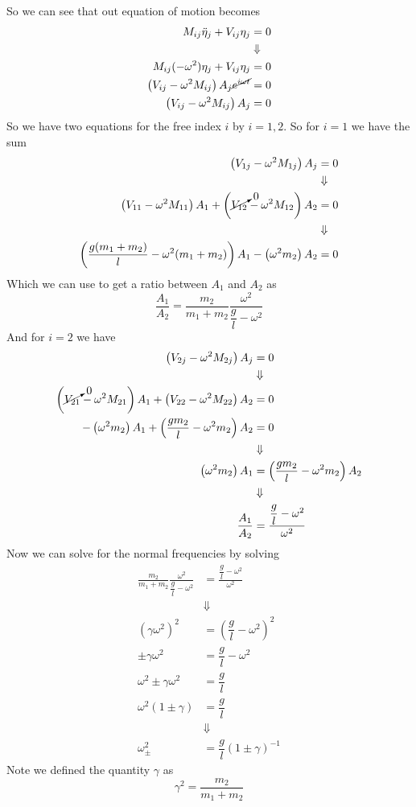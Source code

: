 \documentclass[11pt]{article}
\numberwithin{equation}{section}
\begin{document}
\begin{enumerate}[(a)]
So we can see that out equation of motion becomes
\begin{align*}
M_{ij}\ddot{\eta}_{j} + V_{ij}\eta_{j} &= 0\\
&\Downarrow\\
M_{ij}(-\omega^2)\eta_{j} + V_{ij}\eta_{j} &= 0\\
\left(V_{ij}-\omega^2M_{ij}\right)A_j\cancel{e^{i\omega{t}}} &= 0\\
\left(V_{ij}-\omega^2M_{ij}\right)A_j &= 0
\end{align*}
So we have two equations for the free index $i$ by $i=1,2$. So for $i=1$ we have the sum
\begin{align*}
\left(V_{1j}-\omega^2M_{1j}\right)A_j &= 0\\
&\Downarrow\\
\left(V_{11}-\omega^2M_{11}\right)A_1 + \left(\cancelto{0}{V_{12}}-\omega^2M_{12}\right)A_2 &= 0\\
&\Downarrow\\
\left(\frac{g(m_1+m_2)}{l}-\omega^2(m_1+m_2)\right)A_1 - \left(\omega^2m_2\right)A_2 &= 0
\end{align*}
Which we can use to get a ratio between $A_1$ and $A_2$ as
$$\frac{A_1}{A_2} =  \frac{m_2}{m_1+m_2}\frac{\omega^2}{\dfrac{g}{l}-\omega^2}$$
And for $i=2$ we have
\begin{align*}
\left(V_{2j}-\omega^2M_{2j}\right)A_j &= 0\\
&\Downarrow\\
\left(\cancelto{0}{V_{21}}-\omega^2M_{21}\right)A_1 + \left(V_{22}-\omega^2M_{22}\right)A_2 &= 0\\
-\left(\omega^2m_2\right)A_1 + \left(\frac{gm_2}{l}-\omega^2m_2\right)A_2 &= 0\\
&\Downarrow\\
\left(\omega^2m_2\right)A_1 &= \left(\frac{gm_2}{l}-\omega^2m_2\right)A_2\\
&\Downarrow\\
\frac{A_1}{A_2} &= \frac{\dfrac{g}{l}-\omega^2}{\omega^2}
\end{align*}
Now we can solve for the normal frequencies by solving
\begin{align*}
\frac{m_2}{m_1+m_2}\frac{\omega^2}{\dfrac{g}{l}-\omega^2} &= \frac{\dfrac{g}{l}-\omega^2}{\omega^2}\\
&\Downarrow\\
(\gamma\omega^2)^2 &= (\dfrac{g}{l}-\omega^2)^2\\
\pm\gamma\omega^2 &= \dfrac{g}{l}-\omega^2\\
\omega^2\pm\gamma\omega^2 &= \dfrac{g}{l}\\
\omega^2(1\pm\gamma) &= \dfrac{g}{l}\\
&\Downarrow\\
\omega^2_{\pm} &= \dfrac{g}{l}(1\pm\gamma)^{-1}
\end{align*}
Note we defined the quantity $\gamma$ as
$$\gamma^2 = \frac{m_2}{m_1+m_2}$$


\end{enumerate}
\end{document}
